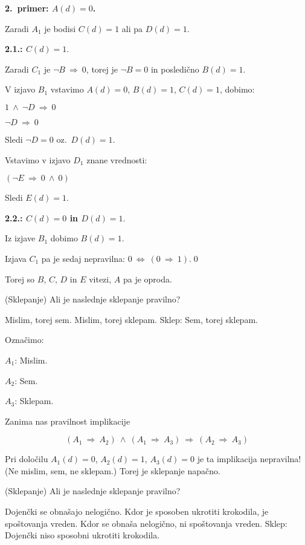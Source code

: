 \documentclass[11pt,paper=b5,footinclude,headinclude]{scrbook} %
\def\inn {{~\wedge~}}
\def\sledi {{~\Rightarrow~}}
\def\cee {{~\Leftrightarrow~}}
\newtheorem{ex}{Vaja\hypertarget{sol:\theex}}[chapter]
\begin{document}
\begin{ex}
\begin{sol}
\textbf{2.~primer: $A(d) = 0$.}

Zaradi $A_1$ je bodisi $C(d) = 1$ ali pa $D(d) = 1$.

\textbf{2.1.: $C(d) = 1$}.

Zaradi $C_1$ je $\neg B \sledi 0$, torej je $\neg B = 0$ in posledično $B(d) = 1$.

V izjavo $B_1$ vstavimo $A(d) = 0$, $B(d) = 1$, $C(d) = 1$, dobimo:

$1 \inn \neg D\sledi 0$

$\neg D\sledi 0$

Sledi $\neg D = 0$ oz.~$D(d) = 1$.

Vstavimo v izjavo $D_1$ znane vrednosti:

$(\neg E \sledi 0 \inn 0)$

Sledi $E(d) = 1$.

\bigskip

\textbf{2.2.: $C(d) = 0$ in $D(d) = 1$}.

Iz izjave $B_1$ dobimo $B(d) = 1$.

Izjava $C_1$ pa je sedaj nepravilna:
$0 \cee (0\sledi 1)$.\qed

Torej so $B$, $C$, $D$ in $E$ vitezi, $A$ pa je oproda.

\end{sol}

\end{ex} \begin{ex} (Sklepanje)
Ali je naslednje sklepanje pravilno?

Mislim, torej sem. Mislim, torej sklepam. Sklep: Sem, torej sklepam.

\begin{sol}Označimo:

$A_1$: Mislim.

$A_2$: Sem.

$A_3$: Sklepam.

Zanima nas pravilnost implikacije

$$(A_1\sledi A_2)\inn(A_1\sledi A_3)\sledi(A_2\sledi A_3)$$

Pri določilu $A_1(d) = 0$, $A_2(d) = 1$, $A_3(d) = 0$ je ta implikacija nepravilna!
(Ne mislim, sem, ne sklepam.)
Torej je sklepanje napačno.

\end{sol}

\end{ex} \begin{ex} (Sklepanje)
Ali je naslednje sklepanje pravilno?

Dojenčki se obnašajo nelogično. Kdor je sposoben ukrotiti krokodila, je spoštovanja vreden.
Kdor se obnaša nelogično, ni spoštovanja vreden. Sklep: Dojenčki niso sposobni ukrotiti krokodila.



\end{ex}
\end{document}
